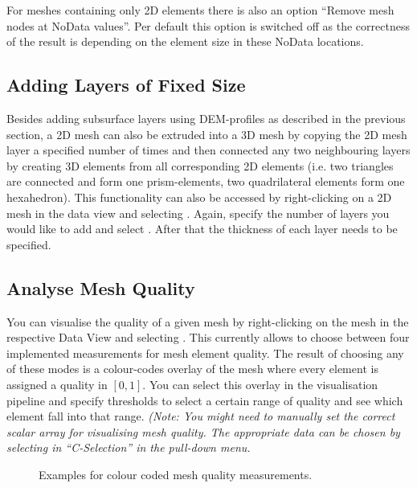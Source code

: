 For meshes containing only 2D elements there is also an option ``Remove mesh nodes at NoData values''. Per default this option is switched off as the correctness of the result is depending on the element size in these NoData locations.

\subsection{Adding Layers of Fixed Size}

Besides adding subsurface layers using DEM-profiles as described in the previous section, a 2D mesh can also be extruded into a 3D mesh by copying the 2D mesh layer a specified number of times and then connected any two neighbouring layers by creating 3D elements from all corresponding 2D elements (i.e. two triangles are connected and form one prism-elements, two quadrilateral elements form one hexahedron). This functionality can also be accessed by right-clicking on a 2D mesh in the data view and selecting . Again, specify the number of layers you would like to add and select . After that the thickness of each layer needs to be specified.

\subsection{Analyse Mesh Quality}

You can visualise the quality of a given mesh by right-clicking on the mesh in the respective Data View and selecting . This currently allows to choose between four implemented measurements for mesh element quality. The result of choosing any of these modes is a colour-codes overlay of the mesh where every element is assigned a quality in $[0,1]$. You can select this overlay in the visualisation pipeline and specify thresholds to select a certain range of quality and see which element fall into that range. \emph{(Note: You might need to manually set the correct scalar array for visualising mesh quality. The appropriate data can be chosen by selecting in ``C-Selection'' in the  pull-down menu.}

\begin{figure}[tb]
\begin{center}
\enspace
{}\enspace
{}
\end{center}
\caption{Examples for colour coded mesh quality measurements.} \label{fig:mshqual}
\end{figure}

